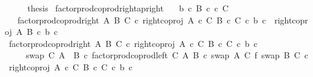 \begin{isabellebody}
\ \ \isamarkupfalse%
\ \isamarkupfalse%
\ {\isacharquery}{\kern0pt}thesis\isacommand{{\isachardot}{\kern0pt}}\isamarkupfalse%
\isanewline
{}\isamarkupfalse%
%
\endisatagproof
{\isafoldproof}%
%
\isadelimproof
\isanewline
%
\endisadelimproof
\isanewline
{}\isamarkupfalse%
\ factor{\isacharunderscore}{\kern0pt}prod{\isacharunderscore}{\kern0pt}coprod{\isacharunderscore}{\kern0pt}right{\isacharunderscore}{\kern0pt}ap{\isacharunderscore}{\kern0pt}right{\isacharcolon}{\kern0pt}\isanewline
\ \ \ {\isachardoublequoteopen}b\ {\isasymin}\isactrlsub c\ B{\isachardoublequoteclose}\ {\isachardoublequoteopen}c\ {\isasymin}\isactrlsub c\ C{\isachardoublequoteclose}\isanewline
\ \ \ {\isachardoublequoteopen}factor{\isacharunderscore}{\kern0pt}prod{\isacharunderscore}{\kern0pt}coprod{\isacharunderscore}{\kern0pt}right\ A\ B\ C\ {\isasymcirc}\isactrlsub c\ right{\isacharunderscore}{\kern0pt}coproj\ {\isacharparenleft}{\kern0pt}A\ {\isasymtimes}\isactrlsub c\ C{\isacharparenright}{\kern0pt}\ {\isacharparenleft}{\kern0pt}B\ {\isasymtimes}\isactrlsub c\ C{\isacharparenright}{\kern0pt}\ {\isasymcirc}\isactrlsub c\ {\isasymlangle}b{\isacharcomma}{\kern0pt}\ c{\isasymrangle}\ {\isacharequal}{\kern0pt}\ {\isasymlangle}right{\isacharunderscore}{\kern0pt}coproj\ A\ B\ {\isasymcirc}\isactrlsub c\ b{\isacharcomma}{\kern0pt}\ c{\isasymrangle}{\isachardoublequoteclose}\isanewline
%
\isadelimproof
%
\endisadelimproof
%
\isatagproof
{}\isamarkupfalse%
\ {\isacharminus}{\kern0pt}\isanewline
\ \ \isamarkupfalse%
\ {\isachardoublequoteopen}factor{\isacharunderscore}{\kern0pt}prod{\isacharunderscore}{\kern0pt}coprod{\isacharunderscore}{\kern0pt}right\ A\ B\ C\ {\isasymcirc}\isactrlsub c\ right{\isacharunderscore}{\kern0pt}coproj\ {\isacharparenleft}{\kern0pt}A\ {\isasymtimes}\isactrlsub c\ C{\isacharparenright}{\kern0pt}\ {\isacharparenleft}{\kern0pt}B\ {\isasymtimes}\isactrlsub c\ C{\isacharparenright}{\kern0pt}\ {\isasymcirc}\isactrlsub c\ {\isasymlangle}b{\isacharcomma}{\kern0pt}\ c{\isasymrangle}\isanewline
\ \ \ \ {\isacharequal}{\kern0pt}\ {\isacharparenleft}{\kern0pt}swap\ C\ {\isacharparenleft}{\kern0pt}A\ {\isasymCoprod}\ B{\isacharparenright}{\kern0pt}\ {\isasymcirc}\isactrlsub c\ factor{\isacharunderscore}{\kern0pt}prod{\isacharunderscore}{\kern0pt}coprod{\isacharunderscore}{\kern0pt}left\ C\ A\ B\ {\isasymcirc}\isactrlsub c\ {\isacharparenleft}{\kern0pt}swap\ A\ C\ {\isasymbowtie}\isactrlsub f\ swap\ B\ C{\isacharparenright}{\kern0pt}{\isacharparenright}{\kern0pt}\ {\isasymcirc}\isactrlsub c\ {\isacharparenleft}{\kern0pt}right{\isacharunderscore}{\kern0pt}coproj\ {\isacharparenleft}{\kern0pt}A\ {\isasymtimes}\isactrlsub c\ C{\isacharparenright}{\kern0pt}\ {\isacharparenleft}{\kern0pt}B\ {\isasymtimes}\isactrlsub c\ C{\isacharparenright}{\kern0pt}\ {\isasymcirc}\isactrlsub c\ {\isasymlangle}b{\isacharcomma}{\kern0pt}\ c{\isasymrangle}{\isacharparenright}{\kern0pt}{\isachardoublequoteclose}\isanewline

\end{isabellebody}

